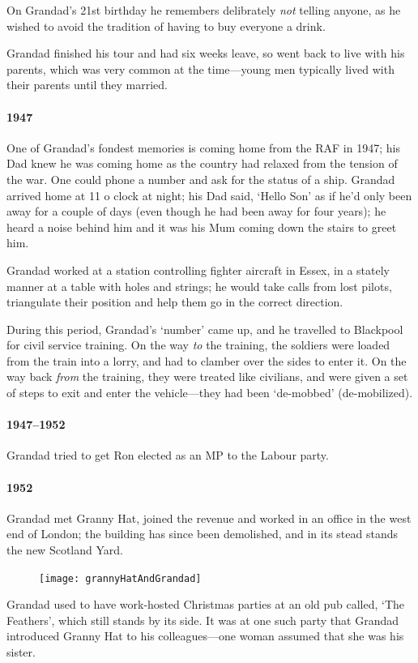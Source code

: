 On Grandad's 21st birthday he remembers delibrately \emph{not} telling anyone, as
he wished to avoid the tradition of having to buy everyone a drink.

Grandad finished his tour and had six weeks leave, so went back to live with his parents, which was
very common at the time---young men typically lived with their parents until they married.

\paragraph{1947} One of Grandad's fondest memories is coming home from the RAF in 1947; his Dad knew
he was coming home  as the country had relaxed from the tension of the war.
One could phone a number and ask for the status of a ship. Grandad arrived home at
11 o clock at night; his Dad said, `Hello Son' as if he'd only been away for
a couple of days (even though he had been away for four years); he heard a noise
behind him and it was his Mum coming down the stairs to greet him.

Grandad worked at a station controlling fighter aircraft in Essex, in a stately manner at a table
with holes and strings; he would take calls from lost pilots, triangulate their position
and help them go in the correct direction.

During this period, Grandad's `number' came up, and he travelled to Blackpool for
civil service training. On the way \emph{to} the training, the soldiers were loaded from
the train into a lorry, and had to clamber over the sides to enter it. On the
way back \emph{from} the training, they were treated like civilians, and were
given a set of steps to exit and enter the vehicle---they had been `de-mobbed' (de-mobilized).

\paragraph{1947--1952} Grandad tried to get Ron elected as an MP to the Labour party. 

\paragraph{1952} Grandad met Granny Hat, joined the revenue and worked in an office
in the west end of London; the building has since been demolished, and in its stead
stands the new Scotland Yard.

\begin{figure}
	\centering
	\texttt{[image: grannyHatAndGrandad]}
\end{figure}
Grandad used to have work-hosted Christmas parties at an old pub called, `The Feathers', which still stands by its side.
It was at one such party that Grandad introduced Granny Hat to his colleagues---one woman
assumed that she was his sister.

